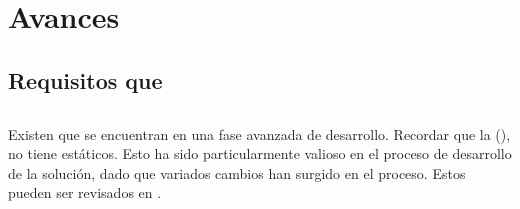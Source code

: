 \chapter{Avances}



\section{Requisitos  que \folderAccount}







\section{\dataModelAS}

Existen \dataModelsAS que se encuentran en una fase avanzada de desarrollo. Recordar que la \dataBaseDB (\mongodbNAME), no tiene \schemasDB estáticos. Esto ha sido particularmente valioso en el proceso de desarrollo de la solución, dado que variados cambios han surgido en el proceso. Estos \dataModelsAS pueden ser revisados en .

